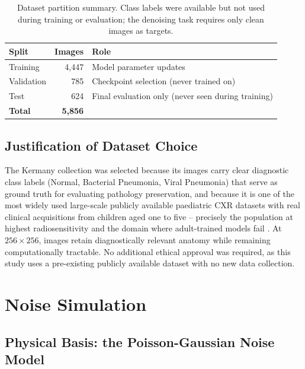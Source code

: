 \documentclass[12pt, a4paper, twoside, openright]{book}
\begin{document}
\begin{table}[htbp]
\centering
\caption{Dataset partition summary. Class labels were available but not used during
training or evaluation; the denoising task requires only clean images as targets.}
\label{tab:methods:dataset}
\begin{tabular}{lrl}
\toprule
\textbf{Split} & \textbf{Images} & \textbf{Role} \\
\midrule
Training & 4,447 & Model parameter updates \\
Validation & 785 & Checkpoint selection (never trained on) \\
Test & 624 & Final evaluation only (never seen during training) \\
\midrule
\textbf{Total} & \textbf{5,856} & \\
\bottomrule
\end{tabular}
\end{table}

\subsection{Justification of Dataset Choice}
\label{sec:methods:dataset:justification}

The Kermany collection was selected because its images carry clear diagnostic class labels (Normal, Bacterial Pneumonia, Viral Pneumonia) that serve as ground truth for evaluating pathology preservation, and because it is one of the most widely used large-scale publicly available paediatric CXR datasets with real clinical acquisitions from children aged one to five -- precisely the population at highest radiosensitivity \cite{smith-bindman_hematologic_2025} and the domain where adult-trained models fail \cite{laborie_scoping_2026}. At $256\times256$, images retain diagnostically relevant anatomy while remaining computationally tractable. No additional ethical approval was required, as this study uses a pre-existing publicly available dataset with no new data collection.

\section{Noise Simulation}
\label{sec:methods:noise}

\subsection{Physical Basis: the Poisson-Gaussian Noise Model}
\label{sec:methods:noise:model}
\end{document}
